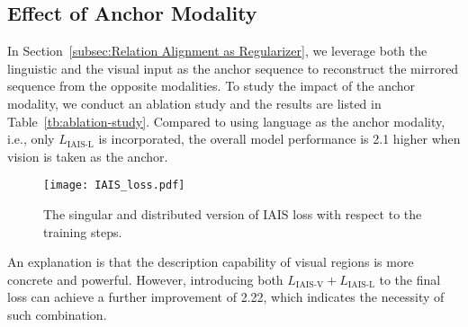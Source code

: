 \documentclass[11pt,a4paper]{article}
\begin{document}
\subsection{Effect of Anchor Modality}
In Section~\ref{subsec:Relation Alignment as Regularizer}, we leverage both the linguistic and the visual input as the anchor sequence to reconstruct the mirrored sequence from the opposite modalities. 
To study the impact of the anchor modality, we conduct an ablation study and the results are listed in Table~\ref{tb:ablation-study}. 
Compared to using language as the anchor modality, i.e., only $L_\text{IAIS-L}$ is incorporated, the overall model performance is 2.1 higher when vision is taken as the anchor. \begin{figure}[t]
    \centering
    \texttt{[image: IAIS\_loss.pdf]}
    \caption{The singular and distributed version of IAIS loss with respect to the training steps.}
    \label{fig:IAIS-loss}
\end{figure}
An explanation is that the description capability of visual regions is more concrete and powerful. 
However, introducing both $L_\text{IAIS-V} + L_\text{IAIS-L}$ to the final loss can achieve a further improvement of 2.22, which indicates the necessity of such combination.
\end{document}
